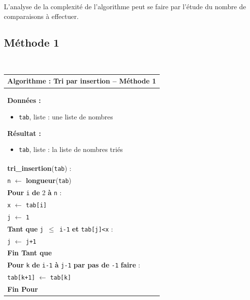 \documentclass[10pt,fleqn]{article} %
\newcommand{\tsf}[1]{\small{\texttt{#1}}}
\begin{document}
L'analyse de la complexité de l'algorithme peut se faire par l'étude du nombre de comparaisons à effectuer.
\subsection{Méthode 1}

\begin{pseudo}
~\\
\begin{minipage}[c]{.48\linewidth}
\begin{tabular}{p{}}
\hline
\textbf{Algorithme :} Tri par insertion -- Méthode 1\\
\hline
\textbf{Données :}
\begin{itemize}
\item \tsf{tab}, liste : une liste de nombres
\end{itemize}
\textbf{Résultat :} 
\begin{itemize}
\item \tsf{tab}, liste : la liste de nombres triés
\end{itemize}
\\
\textbf{tri\_insertion}(\tsf{tab}) :\\
\hspace{.4cm} \tsf{n} $\leftarrow$ \textbf{longueur}(\tsf{tab}) \\
\hspace{.4cm}\textbf{Pour} \tsf{i} \textbf{de} 2 \textbf{à} \tsf{n} : \\
\hspace{.8cm} \tsf{x} $\leftarrow$ \tsf{tab[i]} \\
\hspace{.8cm} \tsf{j} $\leftarrow$ \tsf{1} \\
\hspace{.8cm}\textbf{Tant que} \tsf{j $\leq$ i-1} \textbf{et} \tsf{tab[j]<x}  : \\
\hspace{1.2cm} \tsf{j} $\leftarrow$ \tsf{j+1} \\
\hspace{.8cm}\textbf{Fin Tant que} \\
\hspace{.8cm}\textbf{Pour} \tsf{k} \textbf{de} \tsf{i-1} \textbf{à} \tsf{j-1} \textbf{par pas de} \tsf{-1} \textbf{faire} : \\
\hspace{1.2cm} \tsf{tab[k+1]} $\leftarrow$ \tsf{tab[k]} \\
\hspace{.8cm} \textbf{Fin Pour} \\

\end{tabular}
\end{minipage}
\end{pseudo}
\end{document}
